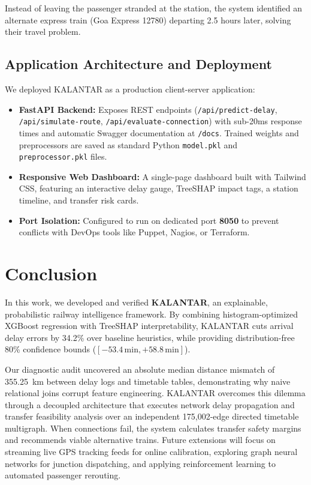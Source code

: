 \documentclass[11pt,a4paper]{article}
\begin{document}
Instead of leaving the passenger stranded at the station, the system identified an alternate express train (Goa Express 12780) departing 2.5 hours later, solving their travel problem.

\subsection{Application Architecture and Deployment}
We deployed KALANTAR as a production client-server application:
\begin{itemize}[leftmargin=1.5em]
    \item \textbf{FastAPI Backend:} Exposes REST endpoints (\texttt{/api/predict-delay}, \texttt{/api/simulate-route}, \texttt{/api/evaluate-connection}) with sub-20ms response times and automatic Swagger documentation at \texttt{/docs}. Trained weights and preprocessors are saved as standard Python \texttt{model.pkl} and \texttt{preprocessor.pkl} files.
    \item \textbf{Responsive Web Dashboard:} A single-page dashboard built with Tailwind CSS, featuring an interactive delay gauge, TreeSHAP impact tags, a station timeline, and transfer risk cards.
    \item \textbf{Port Isolation:} Configured to run on dedicated port \textbf{8050} to prevent conflicts with DevOps tools like Puppet, Nagios, or Terraform.
\end{itemize}

\section{Conclusion}

In this work, we developed and verified \textbf{KALANTAR}, an explainable, probabilistic railway intelligence framework. By combining histogram-optimized XGBoost regression with TreeSHAP interpretability, KALANTAR cuts arrival delay errors by 34.2\% over baseline heuristics, while providing distribution-free 80\% confidence bounds ($[-53.4\,\mathrm{min}, +58.8\,\mathrm{min}]$).

Our diagnostic audit uncovered an absolute median distance mismatch of 355.25~km between delay logs and timetable tables, demonstrating why naive relational joins corrupt feature engineering. KALANTAR overcomes this dilemma through a decoupled architecture that executes network delay propagation and transfer feasibility analysis over an independent 175,002-edge directed timetable multigraph. When connections fail, the system calculates transfer safety margins and recommends viable alternative trains. Future extensions will focus on streaming live GPS tracking feeds for online calibration, exploring graph neural networks for junction dispatching, and applying reinforcement learning to automated passenger rerouting.
\end{document}
